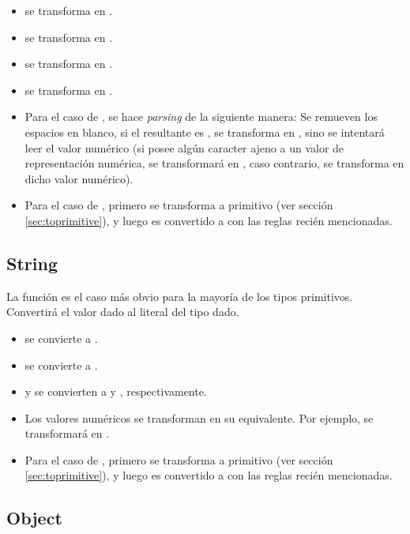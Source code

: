 \begin{itemize}
\item {} se transforma en .
\item {} se transforma en .
\item {} se transforma en .
\item {} se transforma en .
\item Para el caso de , se hace \textit{parsing} de la siguiente manera: Se remueven los espacios en blanco, si el  resultante es , se transforma en , sino se intentará leer el valor numérico (si posee algún caracter ajeno a un valor de representación numérica, se transformará en , caso contrario, se transforma en dicho valor numérico).
\item Para el caso de , primero se transforma a primitivo (ver sección \ref{sec:toprimitive}), y luego es convertido a  con las reglas recién mencionadas.
\end{itemize}

\subsection{String}

La función  es el caso más obvio para la mayoría de los tipos primitivos. Convertirá el valor dado al literal  del tipo dado.

\begin{itemize}
\item {} se convierte a .
\item {} se convierte a .
\item {} y  se convierten a  y , respectivamente.
\item Los valores numéricos se transforman en su  equivalente. Por ejemplo,  se transformará en .
\item Para el caso de , primero se transforma a primitivo (ver sección \ref{sec:toprimitive}), y luego es convertido a  con las reglas recién mencionadas.
\end{itemize}

\subsection{Object}

